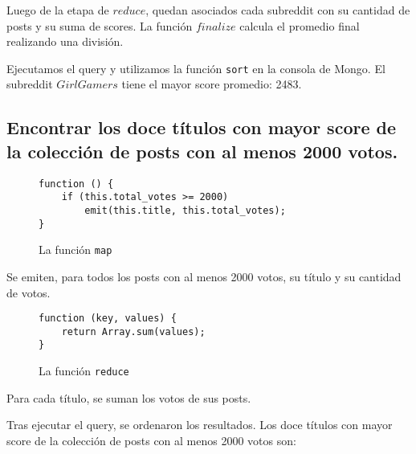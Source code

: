 \documentclass[11pt, a4paper, twoside]{article}
\begin{document}
Luego de la etapa de $reduce$, quedan asociados cada subreddit con su cantidad de posts y su suma de scores. La función $finalize$ calcula el promedio final realizando una división.

Ejecutamos el query y utilizamos la función \texttt{sort} en la consola de Mongo. El subreddit $GirlGamers$ tiene el mayor score promedio: 2483.

\newpage
\subsection{Encontrar los doce títulos con mayor score de la colección de posts con al menos 2000 votos.}

\begin{figure}[H]
\caption{La función \texttt{map}}
\centering
\begin{verbatim}
function () {
    if (this.total_votes >= 2000)
        emit(this.title, this.total_votes);
}
\end{verbatim}
\end{figure}

Se emiten, para todos los posts con al menos 2000 votos, su título y su cantidad de votos.

\begin{figure}[H]
\caption{La función \texttt{reduce}}
\centering
\begin{verbatim}
function (key, values) {
    return Array.sum(values);
}
\end{verbatim}
\end{figure}

Para cada título, se suman los votos de sus posts.

Tras ejecutar el query, se ordenaron los resultados. Los doce títulos con mayor score de la colección de posts con al menos 2000 votos son:
\end{document}
